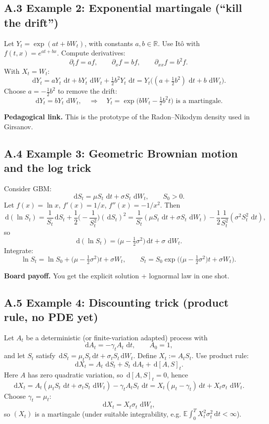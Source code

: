 \documentclass[11pt]{article}
\theoremstyle{definition}
\theoremstyle{remark}
\newcommand{\E}{\mathbb{E}}
\newcommand{\R}{\mathbb{R}}
\newcommand{\1}{\mathbf{1}}
\newcommand{\dd}{\,\mathrm{d}}
\theoremstyle{definition}
\begin{document}
\subsection*{A.3 Example 2: Exponential martingale (``kill the drift'')}
Let $Y_t=\exp(a t + b W_t)$, with constants $a,b\in\R$.
Use It\^o with $f(t,x)=e^{at+bx}$.
Compute derivatives:
\[
\partial_t f = a f,\qquad \partial_x f = b f,\qquad \partial_{xx}f=b^2 f.
\]
With $X_t=W_t$:
\[
\dd Y_t = aY_t\,\dd t + bY_t\,\dd W_t + \tfrac12 b^2 Y_t\,\dd t
= Y_t\Big( (a+\tfrac12 b^2)\,\dd t + b\,\dd W_t\Big).
\]
Choose $a=-\tfrac12 b^2$ to remove the drift:
\[
\dd Y_t = bY_t\,\dd W_t,
\quad\Rightarrow\quad
Y_t=\exp\Big(bW_t-\tfrac12 b^2 t\Big)
\text{ is a martingale.}
\]


\textbf{Pedagogical link.} This is the prototype of the Radon--Nikodym density used in Girsanov.


\subsection*{A.4 Example 3: Geometric Brownian motion and the log trick}
Consider GBM:
\[
\dd S_t = \mu S_t\,\dd t + \sigma S_t\,\dd W_t,\qquad S_0>0.
\]
Let $f(x)=\ln x$, $f'(x)=1/x$, $f''(x)=-1/x^2$.
Then
\[
\dd(\ln S_t)
=
\frac{1}{S_t}\dd S_t + \frac12\Big(-\frac{1}{S_t^2}\Big)(\dd S_t)^2
=
\frac{1}{S_t}(\mu S_t\,\dd t+\sigma S_t\,\dd W_t)
-\frac12\frac{1}{S_t^2}(\sigma^2 S_t^2\,\dd t),
\]
so
\[
\dd(\ln S_t) = \Big(\mu-\tfrac12\sigma^2\Big)\dd t + \sigma\,\dd W_t.
\]
Integrate:
\[
\ln S_t = \ln S_0 + \Big(\mu-\tfrac12\sigma^2\Big)t + \sigma W_t,
\qquad
S_t = S_0\exp\Big(\Big(\mu-\tfrac12\sigma^2\Big)t+\sigma W_t\Big).
\]


\textbf{Board payoff.} You get the explicit solution + lognormal law in one shot.


\subsection*{A.5 Example 4: Discounting trick (product rule, no PDE yet)}
Let $A_t$ be a deterministic (or finite-variation adapted) process with
\[
\dd A_t = -\gamma_t A_t\,\dd t,
\qquad A_0=1,
\]
and let $S_t$ satisfy $\dd S_t = \mu_t S_t\dd t + \sigma_t S_t\dd W_t$.
Define $X_t:=A_t S_t$. Use product rule:
\[
\dd X_t = A_t\,\dd S_t + S_t\,\dd A_t + \dd[A,S]_t.
\]
Here $A$ has zero quadratic variation, so $\dd[A,S]_t=0$, hence
\[
\dd X_t = A_t(\mu_t S_t\,\dd t+\sigma_t S_t\,\dd W_t) - \gamma_t A_t S_t\,\dd t
= X_t(\mu_t-\gamma_t)\dd t + X_t\sigma_t\,\dd W_t.
\]
Choose $\gamma_t=\mu_t$:
\[
\dd X_t = X_t\sigma_t\,\dd W_t,
\]
so $(X_t)$ is a martingale (under suitable integrability, e.g. $\E\int_0^T X_t^2\sigma_t^2\dd t<\infty$).
\end{document}
